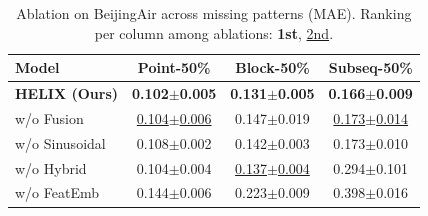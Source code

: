 \begin{table}[t]
    \caption{Ablation on BeijingAir across missing patterns (MAE). Ranking per column among ablations: \textbf{1st}, \underline{2nd}.}
    \label{tab:ablation_beijingair}
    \centering
    \begin{small}
    \begin{tabular}{l|ccc}
        \toprule
        \textbf{Model} & \textbf{Point-50\%} & \textbf{Block-50\%} & \textbf{Subseq-50\%} \\
        \midrule
        \textbf{HELIX (Ours)} & \textbf{0.102$\pm$0.005} & \textbf{0.131$\pm$0.005} & \textbf{0.166$\pm$0.009} \\
        w/o Fusion & \underline{0.104$\pm$0.006} & 0.147$\pm$0.019 & \underline{0.173$\pm$0.014} \\
        w/o Sinusoidal & 0.108$\pm$0.002 & 0.142$\pm$0.003 & 0.173$\pm$0.010 \\
        w/o Hybrid & 0.104$\pm$0.004 & \underline{0.137$\pm$0.004} & 0.294$\pm$0.101 \\
        w/o FeatEmb & 0.144$\pm$0.006 & 0.223$\pm$0.009 & 0.398$\pm$0.016 \\
        \bottomrule
    \end{tabular}
    \end{small}
\end{table}